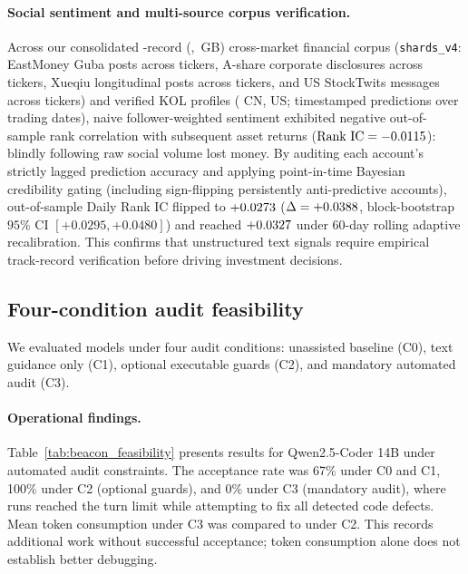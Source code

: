 \paragraph{Social sentiment and multi-source corpus verification.}
Across our consolidated \CorpusTotalRecords{}-record (\CorpusTotalShort{}, \CorpusTotalSizeGB{}\,GB)
cross-market financial corpus (\texttt{shards\_v4}: \CorpusGubaRecords{} EastMoney Guba posts across
\CorpusGubaTickers{} tickers, \CorpusAnnounceRecords{} A-share corporate disclosures across
\CorpusAnnounceTickers{} tickers, \CorpusXueqiuRecords{} Xueqiu longitudinal posts across
\CorpusXueqiuTickers{} tickers, and \CorpusStockTwitsRecords{} US StockTwits messages across
\CorpusStockTwitsTickers{} tickers) and \KOLTotalAccounts{} verified KOL profiles (\KOLCNCount{} CN,
\KOLUSCount{} US; \KOLPredRows{} timestamped predictions over \KOLTradingDates{} trading dates),
naive follower-weighted sentiment exhibited negative out-of-sample rank correlation with subsequent
asset returns ($\text{Rank IC} = -0.0115{}$): blindly following raw social volume lost money.
By auditing each account's strictly lagged prediction accuracy and applying point-in-time Bayesian
credibility gating (including sign-flipping persistently anti-predictive accounts), out-of-sample
Daily Rank IC flipped to $+0.0273{}$ ($\Delta = +0.0388{}$, block-bootstrap $95\%$ CI
$[+0.0295, +0.0480]$) and reached $+0.0327{}$ under 60-day rolling adaptive recalibration.
This confirms that unstructured text signals require empirical track-record verification before
driving investment decisions.

\subsection{Four-condition audit feasibility}
We evaluated models under four audit conditions: unassisted baseline (C0), text guidance
only (C1), optional executable guards (C2), and mandatory automated audit (C3).

\paragraph{Operational findings.}
Table~\ref{tab:beacon_feasibility} presents results for Qwen2.5-Coder 14B under automated audit
constraints. The acceptance rate was 67\% under C0 and C1, 100\% under C2 (optional guards),
and 0\% under C3 (mandatory audit), where runs reached the turn limit while attempting to fix
all detected code defects. Mean token consumption under C3 was \BeaconFourteenCThreeMeanTokens{}
compared to \BeaconFourteenCTwoMeanTokens{} under C2. This records additional work without
successful acceptance; token consumption alone does not establish better debugging.

